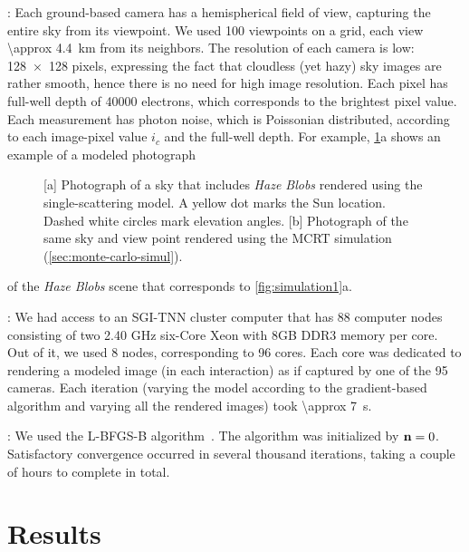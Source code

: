 \documentclass[10pt,letterpaper]{article}
\newcommand{\yoavcomment}[1]{}
\renewcommand{\yoavcomment}[1]{#1} %
\begin{document}
: Each ground-based camera has a hemispherical
field of view, capturing the entire sky from its viewpoint. We used
100 viewpoints on a grid, each view \SI{\approx 4.4}{\km} from its
neighbors.  The resolution of each camera is low: \num{128 x 128}
pixels, expressing the fact that cloudless (yet hazy) sky images are
rather smooth, hence there is no need for high image resolution. Each
pixel has full-well depth of 40000 electrons, which corresponds to the
brightest pixel value. Each measurement has photon noise, which is
Poissonian distributed, according to each image-pixel value $i_c$ and
the full-well depth. For example, \cref{fig:simulation-results1}a
shows an example of a modeled photograph
\begin{figure}
  \centering
  \yoavcomment{\def\svgwidth{0.7\columnwidth}}
  \caption{\small [a] Photograph of a sky that includes {\em Haze
      Blobs} rendered using the single-scattering model.  A yellow dot
    marks the Sun location. Dashed white circles mark elevation
    angles.  [b] Photograph of the same sky and view point rendered
    using the MCRT simulation (\cref{sec:monte-carlo-simul}).}
  \label{fig:simulation-results1}
\end{figure}
of the {\em Haze Blobs} scene that corresponds to
\cref{fig:simulation1}a.

: We had access to an SGI-TNN cluster computer
that has 88 computer nodes consisting of two 2.40 GHz six-Core Xeon
with 8GB DDR3 memory per core. Out of it, we used 8 nodes,
corresponding to 96 cores. Each core was dedicated to rendering a
modeled image (in each interaction) as if captured by one of the 95
cameras. Each iteration (varying the model according to the
gradient-based algorithm and varying all the rendered images) took
\SI{\approx 7}{\second}.

: We used the L-BFGS-B
algorithm~\cite{BFGS}. The algorithm was initialized by ${\bf
  n}=0$. Satisfactory convergence occurred in several thousand
iterations, taking a couple of hours to complete in total.


\section{Results}
\label{sec:optimization-results}
\end{document}
